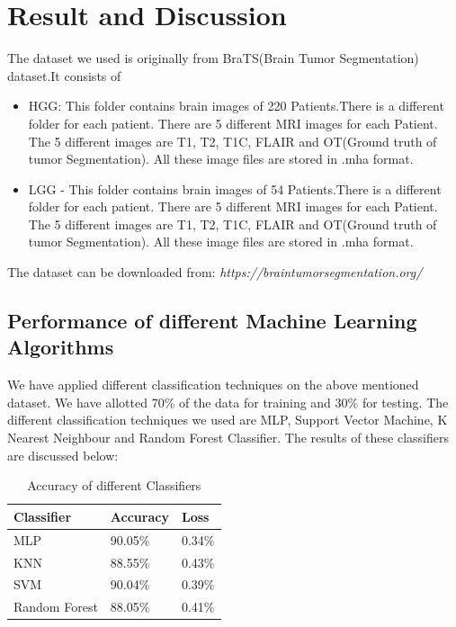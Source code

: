 
\chapter{Result and Discussion}%

\label{Chapter5} %


The dataset we used is originally from BraTS(Brain Tumor Segmentation) dataset.It consists of 

\begin{itemize}
    \item HGG: This folder contains brain images of 220 Patients.There is a
       different folder for each patient. There are 5 different MRI images
       for each Patient. The 5 different images are T1, T2, T1C, FLAIR and
       OT(Ground truth of tumor Segmentation). All these image files
       are stored in .mha format.
       \item LGG - This folder contains brain images of 54 Patients.There is a
       different folder for each patient. There are 5 different MRI images
       for each Patient. The 5 different images are T1, T2, T1C, FLAIR and
       OT(Ground truth of tumor Segmentation). All these image files
       are stored in .mha format.
\end{itemize}
The dataset can be downloaded from: \emph{https://braintumorsegmentation.org/}

\section{Performance of different Machine Learning Algorithms}
We have applied different classification techniques on the above mentioned dataset.  We have allotted 70\% of the data for training and 30\% for testing.  The different classification techniques we used are MLP,  Support Vector Machine, K Nearest Neighbour and Random Forest Classifier.  The results of these classifiers are discussed below:

\begin{table}[h!]
    \centering
    \begin{tabular}{|p{2cm}|l|l|}
    \hline
    \textbf{Classifier} & \textbf{Accuracy}  & \textbf{Loss} \\
    \hline
    MLP & 90.05\% & 0.34\% \\
    \hline
    KNN & 88.55\%  & 0.43\% \\
    \hline
    SVM & 90.04\% & 0.39\% \\
    \hline
    Random Forest & 88.05\% & 0.41\% \\
    \hline
    \end{tabular}
    \caption{Accuracy of different Classifiers}
    \label{tab:my_label}
\end{table}
\newpage

